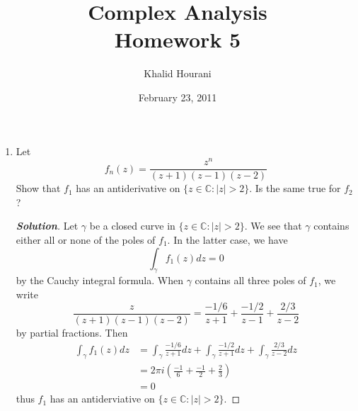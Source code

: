 \documentclass[12pt,leqno]{article}
\title{Complex Analysis\\\large Homework 5}
\date{February 23, 2011}
\author{Khalid Hourani}
\theoremstyle{definition}
\newcommand{\C}{\mathbb{C}}
\newenvironment{Solution}{\begin{proof}[\textnormal{\textbf{Solution}}]}{\end{proof}}
\begin{document}
 \begin{titlepage}
  \maketitle
 \end{titlepage}
\clearpage\mbox{}\clearpage

\setcounter{page}{1}
\begin{enumerate}
 \item Let \[f_n(z)=\frac{z^n}{(z+1)(z-1)(z-2)}\] Show that $f_1$ has an antiderivative on $\{z\in\C:|z|>2\}$. Is the same true for $f_2$?
 \begin{Solution}
 Let $\gamma$ be a closed curve in $\{z\in\C:|z|>2\}$. We see that $\gamma$ contains either all or none of the poles of $f_1$. In the latter case, we have \[\int_{\gamma}f_1(z)dz=0\] by the Cauchy integral formula. When $\gamma$ contains all three poles of $f_1$, we write \[\frac{z}{(z+1)(z-1)(z-2)}=\frac{-1/6}{z+1}+\frac{-1/2}{z-1}+\frac{2/3}{z-2}\] by partial fractions. Then \begin{align*}\int_{\gamma}f_1(z)dz&=\int_{\gamma}\frac{-1/6}{z+1}dz+\int_{\gamma}\frac{-1/2}{z+1}dz+\int_{\gamma}\frac{2/3}{z-2}dz\\&=2\pi i\left(\frac{-1}{6}+\frac{-1}{2}+\frac{2}{3}\right)\\&=0\end{align*} thus $f_1$ has an antiderviative on $\{z\in\C:|z|>2\}$.


\end{Solution}
\end{enumerate}
\end{document}
